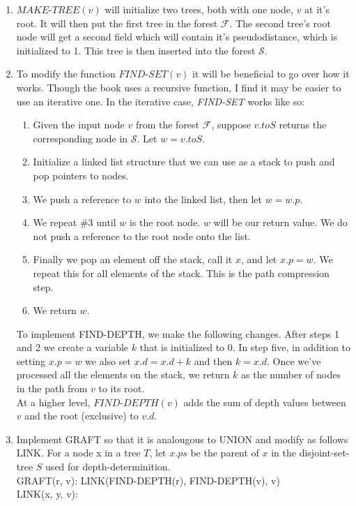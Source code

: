 \documentclass[letterpaper,10pt]{article}
\begin{document}
\begin{enumerate}
\begin{enumerate}
    \item $\textit{MAKE-TREE}(v)$ will initialize two trees, both with one node, $v$ at it's root. It will then put the first tree in the forest $\mathcal{F}$. The second tree's root node will get a second field which will contain it's pseudodistance, which is initialized to 1. This tree is then inserted into the forest $\mathcal{S}$.
    \item To modify the function $\textit{FIND-SET}(v)$ it will be beneficial to go over how it works. Though the book uses a recursive function, I find it may be easier to use an iterative one. In the iterative case, \textit{FIND-SET} works like so:
    \begin{enumerate}[1.]
      \item Given the input node $v$ from the forest $\mathcal{F}$, suppose $v.toS$ returns the corresponding node in $\mathcal{S}$. Let $w = v.toS$. 
      \item Initialize a linked list structure that we can use as a stack to push and pop pointers to nodes. 
      \item We push a reference to $w$ into the linked list, then let $w = w.p$.
      \item We repeat \#3 until $w$ is the root node. $w$ will be our return value. We do not push a reference to the root node onto the list.
      \item Finally we pop an element off the stack, call it $x$, and let $x.p = w$. We repeat this for all elements of the stack. This is the path compression step.
      \item We return $w$.
    \end{enumerate}
    To implement FIND-DEPTH, we make the following changes. After steps 1 and 2 we create a variable $k$ that is initialized to 0.  In step five, in addition to setting $x.p = w$ we also set $x.d = x.d + k$ and then $k = x.d$. Once we've processed all the elements on the stack, we return $k$ as the number of nodes in the path from $v$ to its root. 
\\At a higher level, $\textit{FIND-DEPTH}(v)$ adds the sum of depth values between $v$ and the root (exclusive) to $v.d$.
\newpage
    \item Implement GRAFT so that it is analougous to UNION and modify as follows LINK. For a node x in a tree $T$, let $x.ps$ be the parent of $x$ in the disjoint-set-tree $S$ used for depth-determinition.
\\GRAFT(r, v): LINK(FIND-DEPTH(r), FIND-DEPTH(v), v)
\\LINK(x, y, v):

\end{enumerate}
\end{enumerate}
\end{document}
